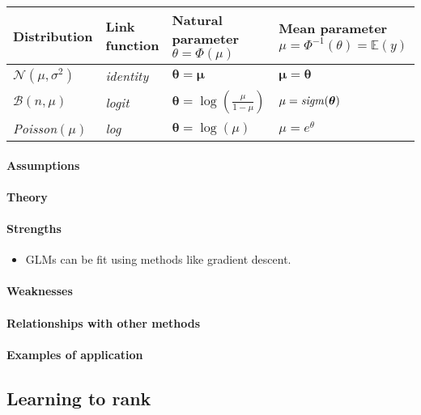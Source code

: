 \begin{center}
    \begin{tabular}{|*{4}{l|}}
    \hline
    \textbf{Distribution} & \textbf{Link function}  & 
    \textbf{Natural parameter} $\theta = \Phi(\mu)$ & \textbf{Mean parameter} $\mu = 
    \Phi^{-1}(\theta) = \mathbb{E}(y)$ \\
    \hline
    $\mathcal{N}(\mu, \sigma^{2})$ & \emph{identity} & $\bm{\theta} = \bm{\mu}$ & 
    $\bm{\mu} = \bm{\theta}$\\
    \hline
    $\mathcal{B}(n,\mu)$ & \emph{logit} & $\bm{\theta} = \log\left(\frac{\mu}{1-\mu}
    \right)$ & $\mu = \text{\emph{sigm}}(\bm{\theta})$\\
    \hline
    \emph{Poisson}$(\mu)$ & \emph{log} & $\bm{\theta} = \log\left(\mu\right)$ & 
    $\mu=e^{\theta}$\\
    \hline
    \end{tabular}
\end{center}

\paragraph{Assumptions}
\paragraph{Theory}
\paragraph{Strengths}
\begin{itemize}
    \item GLMs can be fit using methods like gradient descent.
\end{itemize}

\paragraph{Weaknesses}
\paragraph{Relationships with other methods}
\paragraph{Examples of application}


\subsection{Learning to rank}
